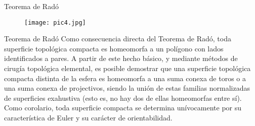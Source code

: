 \documentclass{beamer}
\begin{document}
\begin{frame}{Teorema de Radó}
    \begin{figure}[h]
    \centering
        \begin{minipage}[c]{\textwidth}
        \centering
        \texttt{[image: pic4.jpg]}
        \end{minipage}
    \end{figure}
\end{frame}

\begin{frame}{Teorema de Radó}
    Como consecuencia directa del Teorema de Radó, toda superficie topológica compacta es homeomorfa a un polígono con lados identificados a pares. A partir de este hecho básico, y mediante métodos de cirugía topológica elemental, es posible demostrar que una superficie topológica compacta distinta de la esfera es homeomorfa a una suma conexa de toros o a una suma conexa de projectivos, siendo la unión de estas familias normalizadas de superficies exahustiva (esto es, no hay dos de ellas homeomorfas entre sí). Como corolario, toda superficie compacta se determina unívocamente por su característica de Euler y su carácter de orientabilidad.
\end{frame}
\end{document}
